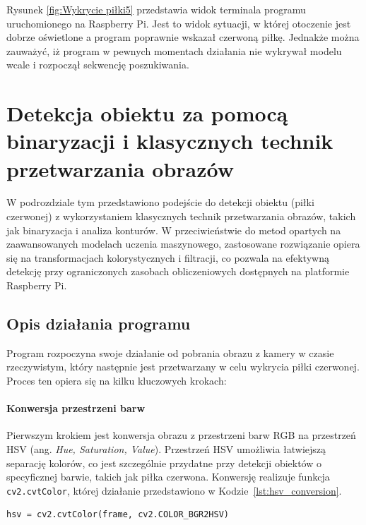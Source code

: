 \documentclass[a4paper,twoside,12pt]{book}
\begin{document}
Rysunek \ref{fig:Wykrycie piłki5} przedstawia widok terminala programu uruchomionego na Raspberry Pi. Jest to widok sytuacji, w której otoczenie jest dobrze oświetlone a program poprawnie wskazał czerwoną piłkę. Jednakże można zauważyć, iż program w pewnych momentach działania nie wykrywał modelu wcale i rozpoczął sekwencję poszukiwania. 

\newpage

\section{Detekcja obiektu za pomocą binaryzacji i klasycznych technik przetwarzania obrazów}

W podrozdziale tym przedstawiono podejście do detekcji obiektu (piłki czerwonej) z wykorzystaniem klasycznych technik przetwarzania obrazów, takich jak binaryzacja i analiza konturów. W przeciwieństwie do metod opartych na zaawansowanych modelach uczenia maszynowego, zastosowane rozwiązanie opiera się na transformacjach kolorystycznych i filtracji, co pozwala na efektywną detekcję przy ograniczonych zasobach obliczeniowych dostępnych na platformie Raspberry Pi.

\subsection{Opis działania programu}

Program rozpoczyna swoje działanie od pobrania obrazu z kamery w czasie rzeczywistym, który następnie jest przetwarzany w celu wykrycia piłki czerwonej. Proces ten opiera się na kilku kluczowych krokach:

\paragraph{Konwersja przestrzeni barw}
Pierwszym krokiem jest konwersja obrazu z przestrzeni barw RGB na przestrzeń HSV (ang. \textit{Hue, Saturation, Value}). Przestrzeń HSV umożliwia łatwiejszą separację kolorów, co jest szczególnie przydatne przy detekcji obiektów o specyficznej barwie, takich jak piłka czerwona. Konwersję realizuje funkcja \texttt{cv2.cvtColor}, której działanie przedstawiono w Kodzie~\ref{lst:hsv_conversion}.

\begin{lstlisting}[language=Python, caption={Konwersja obrazu z przestrzeni RGB do HSV.}, label={lst:hsv_conversion}, captionpos=b]
hsv = cv2.cvtColor(frame, cv2.COLOR_BGR2HSV)
\end{lstlisting}
\end{document}
